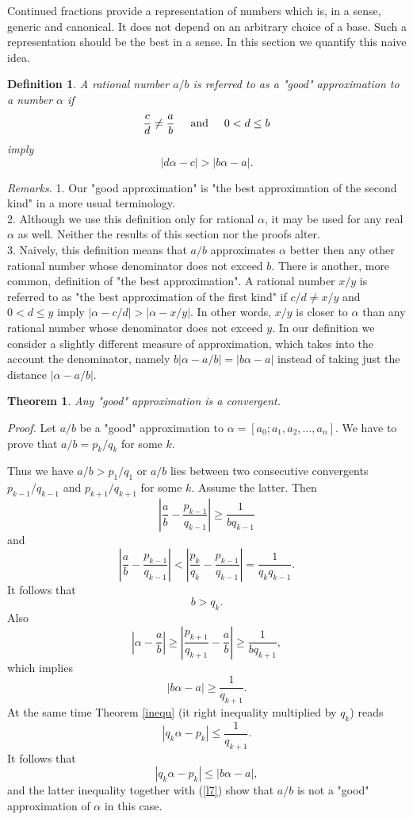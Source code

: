 \documentclass[12pt,letterpaper]{book}
\newtheorem{theorem}{Theorem}
\newtheorem{Def}{Definition}
\begin{document}
Continued fractions provide a representation of numbers which is, in
a sense, generic and canonical. It does not depend on an arbitrary
choice of a base. Such a representation should be the best in a
sense. In this section we quantify this naive idea. 
\begin{Def}
A rational number $a/b$ is referred to as a "good" approximation to
a number $\alpha$ if
$$
\frac{c}{d} \neq \frac{a}{b} \hspace{5mm} \text{and} \hspace{5mm}
0<d \leq b
$$
imply
$$
|d\alpha - c| > |b\alpha -a|.
$$
\end{Def}
{\sl Remarks.} 1. Our "good approximation" is "the best
approximation of the second kind" 
in a more usual terminology. \\
2. Although we use this definition only for rational $\alpha$, it
may be used for any real $\alpha$ as well. Neither the results of
this section nor the proofs
alter. \\
3. Naively, this definition means that $a/b$ approximates $\alpha$
better then any other rational number whose denominator does not
exceed $b$. There is another, more common, definition of "the best
approximation". A rational number $x/y$ is referred to as "the best
approximation of the first kind" if $c/d\neq x/y$ and $0<d\leq y$
imply $|\alpha - c/d|>|\alpha - x/y|$. In other words, $x/y$ is
closer to $\alpha$ than any rational number whose denominator does
not exceed $y$. In our definition we consider a slightly different
measure of approximation, which takes into the account the
denominator, namely $b|\alpha - a/b|=|b\alpha -a|$ instead of taking
just the distance $|\alpha - a/b|$.

\begin{theorem} \label{good}
Any "good" approximation is a convergent.
\end{theorem}

{\sl Proof.} Let $a/b$ be a "good" approximation to $\alpha =
[a_0;a_1,a_2,\ldots,a_n]$. We have to prove that $a/b=p_k/q_k$ for
some $k$.


Thus we have $a/b>p_1/q_1$ or $a/b$ lies between two consecutive
convergents $p_{k-1}/q_{k-1}$ and $p_{k+1}/q_{k+1}$ for some $k$.
Assume the latter. Then
$$
\left\vert \frac{a}{b} - \frac{p_{k-1}}{q_{k-1}} \right\vert \geq
\frac{1}{bq_{k-1}}
$$
and
$$
\left\vert \frac{a}{b} - \frac{p_{k-1}}{q_{k-1}} \right\vert <
\left\vert \frac{p_k}{q_k} - \frac{p_{k-1}}{q_{k-1}} \right\vert =
\frac{1}{q_kq_{k-1}}.
$$
It follows that
\begin{equation} \label{l7}
b>q_k.
\end{equation}
Also
$$
\left\vert \alpha - \frac{a}{b} \right\vert \geq \left\vert
\frac{p_{k+1}}{q_{k+1}} - \frac{a}{b} \right\vert \geq
\frac{1}{bq_{k+1}},
$$
which implies
$$
\left\vert b\alpha - a \right\vert \geq \frac{1}{q_{k+1}}.
$$
At the same time Theorem \ref{inequ} (it right inequality multiplied
by $q_k$) reads
$$
\left\vert q_k \alpha - p_k \right\vert \leq \frac{1}{q_{k+1}}.
$$
It follows that
$$
\left\vert q_k \alpha - p_k \right\vert \leq \left\vert b\alpha - a
\right\vert,
$$
and the latter inequality together with (\ref{l7}) show that $a/b$
is not a "good" approximation of $\alpha$ in this case.
\end{document}
